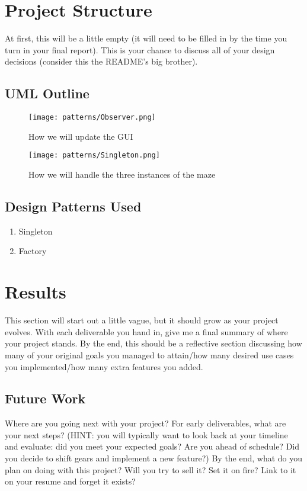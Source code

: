 \documentclass[10pt,conference,onecolumn,compsoc]{IEEEtran}
\begin{document}
\section{Project Structure}
At first, this will be a little empty (it will need to be filled in by the time you turn in your final report).  This is your chance to discuss all of your design decisions (consider this the README's big brother).

\subsection{UML Outline}
\begin{figure}[ht!]
\texttt{[image: patterns/Observer.png]}
\caption{How we will update the GUI}
\label{Game play}
\end{figure}
\begin{figure}[ht!]
\texttt{[image: patterns/Singleton.png]}
\caption{How we will handle the three instances of the maze}
\label{Maze instance}
\end{figure}
\clearpage
\subsection{Design Patterns Used}
\begin{enumerate}
\item Singleton
\item Factory
\end{enumerate}


\section{Results}
This section will start out a little vague, but it should grow as your project evolves.  With each deliverable you hand in, give me a final summary of where your project stands.  By the end, this should be a reflective section discussing how many of your original goals you managed to attain/how many desired use cases you implemented/how many extra features you added.

\subsection{Future Work}
Where are you going next with your project?
For early deliverables, what are your next steps?  (HINT: you will typically want to look back at your timeline and evaluate: did you meet your expected goals?  Are you ahead of schedule?  Did you decide to shift gears and implement a new feature?)
By the end, what do you plan on doing with this project?  Will you try to sell it?  Set it on fire?  Link to it on your resume and forget it exists?
\end{document}

